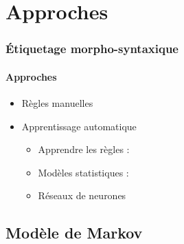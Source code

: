 \documentclass[xcolor=table]{beamer}
\begin{document}
\section{Approches}

\begin{frame}
\frametitle{Étiquetage morpho-syntaxique}
\framesubtitle{Approches}

\begin{itemize}
	\item Règles manuelles 
	\item Apprentissage automatique 
	\begin{itemize}
		\item Apprendre les règles : 
		\item Modèles statistiques : 
		\item Réseaux de neurones
	\end{itemize}
\end{itemize}

\end{frame}

\subsection{Modèle de Markov}
\end{document}
